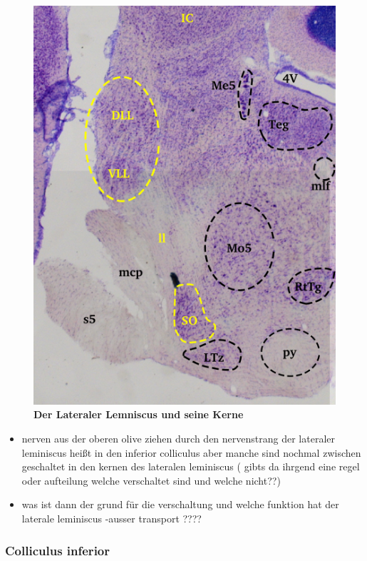 \documentclass[12pt,a4paper,pdftex]{article}
\begin{document}
\begin{figure}
    \centering
    \includegraphics{pictures/auditory/lateral_lemniscus.png}
    \caption[Der Lateraler Lemniscus und seine Kerne]{\textbf{Der Lateraler Lemniscus und seine Kerne}\\
    }
    \label{fig:lateraler_lemniscus}
\end{figure}


    \begin{itemize}
        \item nerven aus der oberen olive ziehen durch den nervenstrang der lateraler leminiscus heißt in den inferior colliculus aber manche sind nochmal zwischen geschaltet in den kernen des lateralen leminiscus ( gibts da ihrgend eine regel oder aufteilung welche verschaltet sind und welche nicht??)
        \item was ist dann der grund für die verschaltung und welche funktion hat der laterale leminiscus -ausser transport ????
    \end{itemize}


\subsubsection*{Colliculus inferior}
\end{document}
